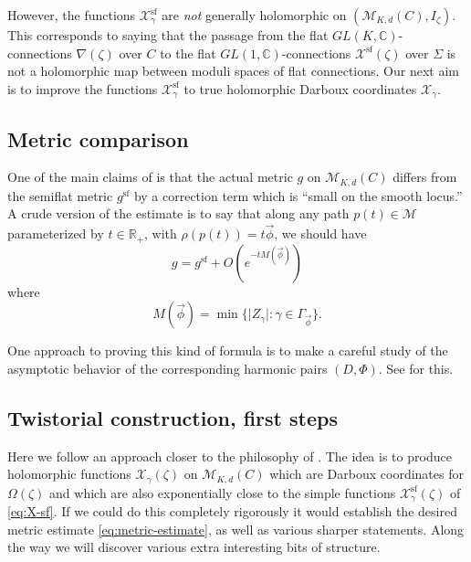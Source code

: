 \documentclass[12pt,letterpaper,reqno]{article}
\numberwithin{equation}{section}
\newcommand{\cM}{\ensuremath{\mathcal M}}
\newcommand{\cX}{\ensuremath{\mathcal X}}
\newcommand{\R}{\ensuremath{\mathbb R}}
\newcommand{\C}{\ensuremath{\mathbb C}}
\renewcommand{\sf}{\mathrm{sf}}
\newcommand{\abs}[1]{\lvert#1\rvert}
\newcommand{\ti}[1]{\textit{#1}}
\newcommand{\fixme}[1]{{\color{orange}{[#1]}}}
\begin{document}
However, the functions $\cX_\gamma^\sf$ are \ti{not} generally holomorphic
on $(\cM_{K,d}(C), I_\zeta)$.
This corresponds to saying that the
passage from the flat $GL(K,\C)$-connections
$\nabla(\zeta)$ over $C$ to the flat $GL(1,\C)$-connections
$\cX^\sf(\zeta)$ over $\Sigma$ is not a holomorphic map
between moduli spaces of flat connections.
Our next aim is to improve the functions
$\cX_\gamma^\sf$ to true holomorphic Darboux
coordinates $\cX_\gamma$.


\subsection{Metric comparison}

One of the main claims of \cite{Gaiotto:2008cd} is that
the actual metric $g$ on $\cM_{K,d}(C)$ differs
from the semiflat metric $g^\sf$ by a correction term
which is ``small on the smooth locus.'' A crude version of the
estimate is to say that along any path $p(t) \in \cM$
parameterized by $t \in \R_+$, with
$\rho(p(t)) = t \vec\phi$, we should have
\begin{equation} \label{eq:metric-estimate}
  g = g^\sf + O(e^{-t M({\vec\phi})})
\end{equation}
where
\begin{equation}
  M({\vec\phi}) = \min\{\abs{Z_\gamma}: \gamma \in \Gamma_{\vec\phi} \}.
\end{equation}

One approach to proving this kind of formula
is to make a careful study of the asymptotic
behavior of the corresponding harmonic pairs $(D,\Phi)$.
See \cite{Mazzeo2014} for this.



\subsection{Twistorial construction, first steps}

Here we follow an approach closer to the philosophy of
\cite{Gaiotto:2008cd}. The idea is to produce holomorphic functions
$\cX_\gamma(\zeta)$ on $\cM_{K,d}(C)$ which are Darboux coordinates for
$\Omega(\zeta)$ and which are also exponentially close
to the simple functions $\cX_\gamma^\sf(\zeta)$
of \eqref{eq:X-sf}. If we could do this completely rigorously
it would establish the desired metric estimate
\eqref{eq:metric-estimate}, as well as various sharper
statements.
Along the way we will discover various
extra interesting bits of structure.

\fixme{motivation for this picture from Stokes phenomena of
irregular ODE}
\end{document}
